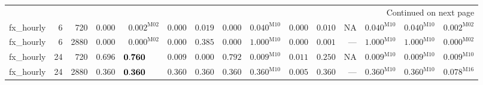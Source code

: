 \begin{longtable}{@{}lrrrrrrrrrrrrrr@{}}
\midrule
\endhead
\midrule\multicolumn{15}{r}{Continued on next page}\\\endfoot
\bottomrule\endlastfoot
fx\_hourly & 6 & 720 & $0.000$ & $0.002^{\mathrm{M02}}$ & $0.000$ & $0.019$ & $0.000$ & $0.040^{\mathrm{M10}}$ & $0.000$ & $0.010$ & \textsc{NA} & $0.040^{\mathrm{M10}}$ & $0.040^{\mathrm{M10}}$ & $0.002^{\mathrm{M02}}$ \\
fx\_hourly & 6 & 2880 & $0.000$ & $0.000^{\mathrm{M02}}$ & $0.000$ & $\mathbf{0.385}$ & $0.000$ & $\mathbf{1.000}^{\mathrm{M10}}$ & $0.000$ & $0.001$ & --- & $\mathbf{1.000}^{\mathrm{M10}}$ & $\mathbf{1.000}^{\mathrm{M10}}$ & $0.000^{\mathrm{M02}}$ \\
fx\_hourly & 24 & 720 & $\mathbf{0.696}$ & $\mathbf{0.760}\hphantom{^{\mathrm{M00}}}$ & $0.009$ & $0.000$ & $\mathbf{0.792}$ & $0.009^{\mathrm{M10}}$ & $0.011$ & $\mathbf{0.250}$ & \textsc{NA} & $0.009^{\mathrm{M10}}$ & $0.009^{\mathrm{M10}}$ & $0.009^{\mathrm{M10}}$ \\
fx\_hourly & 24 & 2880 & $\mathbf{0.360}$ & $\mathbf{0.360}\hphantom{^{\mathrm{M00}}}$ & $\mathbf{0.360}$ & $\mathbf{0.360}$ & $\mathbf{0.360}$ & $\mathbf{0.360}^{\mathrm{M10}}$ & $0.005$ & $\mathbf{0.360}$ & --- & $\mathbf{0.360}^{\mathrm{M10}}$ & $\mathbf{0.360}^{\mathrm{M10}}$ & $0.078^{\mathrm{M16}}$ \\
\end{longtable}

